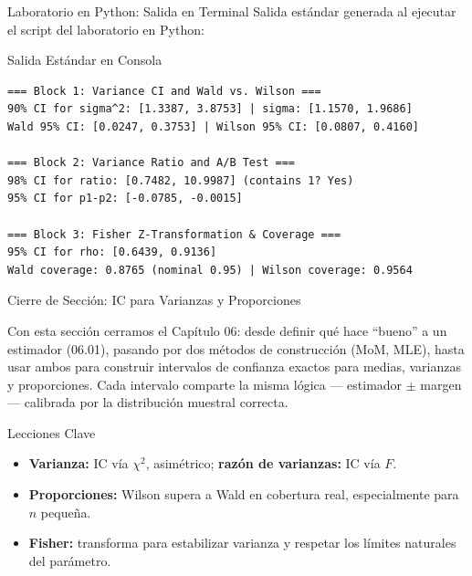 \documentclass[10pt, aspectratio=169]{beamer}
\begin{document}
\begin{frame}[fragile]{Laboratorio en Python: Salida en Terminal}
  \scriptsize
  Salida estándar generada al ejecutar el script del laboratorio en Python:
  \vspace{0.02cm}
  \begin{block}{Salida Estándar en Consola}
    \fontsize{4pt}{5pt}\selectfont
    \begin{verbatim}
=== Block 1: Variance CI and Wald vs. Wilson ===
90% CI for sigma^2: [1.3387, 3.8753] | sigma: [1.1570, 1.9686]
Wald 95% CI: [0.0247, 0.3753] | Wilson 95% CI: [0.0807, 0.4160]

=== Block 2: Variance Ratio and A/B Test ===
98% CI for ratio: [0.7482, 10.9987] (contains 1? Yes)
95% CI for p1-p2: [-0.0785, -0.0015]

=== Block 3: Fisher Z-Transformation & Coverage ===
95% CI for rho: [0.6439, 0.9136]
Wald coverage: 0.8765 (nominal 0.95) | Wilson coverage: 0.9564
    \end{verbatim}
  \end{block}
\end{frame}

\begin{frame}{Cierre de Sección: IC para Varianzas y Proporciones}
  \begin{reflexion}
    Con esta sección cerramos el Capítulo 06: desde definir qué hace ``bueno'' a un estimador (06.01), pasando por dos métodos de construcción (MoM, MLE), hasta usar ambos para construir intervalos de confianza exactos para medias, varianzas y proporciones. Cada intervalo comparte la misma lógica --- estimador $\pm$ margen --- calibrada por la distribución muestral correcta.
  \end{reflexion}

  \vspace{0.2cm}
  \pause
  \begin{block}{Lecciones Clave}
    \begin{itemize}\itemsep=0.08cm
      \item \textbf{Varianza:} IC vía $\chi^2$, asimétrico; \textbf{razón de varianzas:} IC vía $F$.
      \item \textbf{Proporciones:} Wilson supera a Wald en cobertura real, especialmente para $n$ pequeña.
      \item \textbf{Fisher:} transforma para estabilizar varianza y respetar los límites naturales del parámetro.
    \end{itemize}
  \end{block}
\end{frame}
\end{document}
